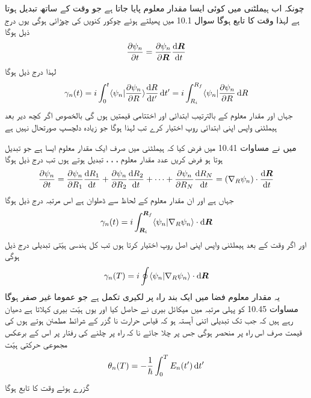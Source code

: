  چونکہ اب ہيملٹنی میں کوئی ایسا مقدار معلوم  پایا جاتا ہے جو وقت کے ساتھ تبدیل ہوتا ہے لہذا  وقت  کا تابع ہوگا سوال 10.1 میں پھیلتے ہوئے چوکور کنویں کی چوڑائی  ہوگی یوں درج ذیل ہوگا 
\begin{align}
\frac{\partial \psi_n}{\partial t} = \frac{\partial \psi_n}{\partial \kvec{R}} \frac{\dif \kvec{R}}{\dif t}
\end{align}
لہذا درج ذیل ہوگا 
\begin{align}
\gamma_n (t) = i \int_0^t \langle \psi_n | \frac{\partial \psi_n}{\partial R} \rangle \frac{\dif R}{\dif t'} \dif t' = i \int_{R_i}^{R_f} \langle \psi_n | \frac{\partial \psi_n}{\partial R} \dif R 
\end{align}
جہاں  اور  مقدار معلوم  کے بالترتیب ابتدائی اور اختتامی قیمتیں ہوں گی بالخصوص اگر کچھ دیر  بعد ہیملٹنی واپس اپنی ابتدائی روپ اختیار کرے تب  لہذا  ہوگا جو زیادہ دلچسپ  صورتحال نہیں ہے

 میں نے مساوات 10.41 میں فرض کیا کہ ہيملٹنی میں صرف ایک مقدار معلوم ایسا ہے جو تبدیل ہوتا ہو فرض کریں  عدد مقدار معلوم ،  ، ،  تبدیل ہوتے ہوں تب درج ذیل ہوگا 
\begin{align}
\frac{\partial \psi_n}{\partial t} = \frac{\partial \psi_n}{\partial R_1} \frac{\dif R_1}{\dif t} + \frac{\partial \psi_n}{\partial R_2} \frac{\dif R_2}{\dif t} + \cdots + \frac{\partial \psi_n}{\partial R_N} \frac{\dif R_N}{\dif t} = (\nabla_R \psi_n) \cdot \frac{\dif \kvec{R}}{\dif t}
\end{align} 
جہاں  ہے اور  ان مقدار معلوم کے لحاظ سے ڈھلوان ہے اس مرتبہ درج ذیل ہوگا 
\begin{align}
\gamma_n (t) = i \int_{\kvec{R}_i}^{\kvec{R}_f} \langle \psi_n | \nabla_R \psi_n \rangle \cdot \dif \kvec{R}
\end{align}
اور اگر وقت  کے بعد ہیملٹنی واپس اپنی اصل روپ اختیار کرتا ہوں تب کل ہندسى ہیّتی تبدیلی درج ذیل ہوگی 
\begin{align}
\gamma_n (T) = i \oint \langle \psi_n | \nabla_R \psi_n \rangle \cdot \dif \kvec{R}
\end{align}
یہ مقدار معلوم فضا میں ایک بند راہ پر لکیری تکمل ہے جو عموما غیر صفر ہوگا مساوات 10.45 کو پہلی مرتبہ    میں میکائل بیری نے حاصل کیا اور یوں  ہیّت بیری کہلاتا ہے دھیان رہے ہیں کہ جب تک تبدیلی اتنی آہستہ ہو کہ قیاس حرارت نا گزر کے شرائط مطمئن ہوتے ہوں  کی قیمت صرف اس راہ پر منحصر ہوگی جس پر چلا جائے نا کہ راہ پر چلنے کی رفتار پر اس کے برعکس مجموعی حرکتی ہیّت 
\begin{align*}
\theta_n (T) = - \frac{1}{\hslash} \int_0^T E_n (t') \dif t'
\end{align*}
گزرے ہوئے وقت کا تابع ہوگا

